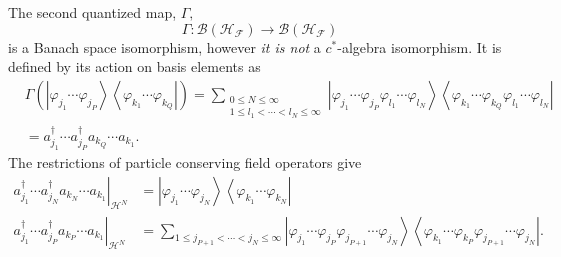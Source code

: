 \documentclass[aps,preprint]{revtex4}%
\begin{document}
The second quantized map, $\Gamma,$%
\begin{equation}
\Gamma:\mathcal{B}\left(  \mathcal{H}_{\mathcal{F}}\right)  \longrightarrow
\mathcal{B}\left(  \mathcal{H}_{\mathcal{F}}\right)
\end{equation}
is a Banach space isomorphism, however \emph{it is not} a $c^{\ast}$-algebra
isomorphism. It is defined by its action on basis elements as
\begin{align}
&  \Gamma\left(  \left\vert \varphi_{j_{1}}\cdots\varphi_{j_{P}}\right\rangle
\left\langle \varphi_{k_{1}}\cdots\varphi_{k_{Q}}\right\vert \right)
=\sum_{\substack{0\leq N\leq\infty\\1\leq l_{1}<\cdots<l_{N}\leq\infty
}}\left\vert \varphi_{j_{1}}\cdots\varphi_{j_{P}}\varphi_{l_{1}}\cdots
\varphi_{l_{N}}\right\rangle \left\langle \varphi_{k_{1}}\cdots\varphi_{k_{Q}%
}\varphi_{l_{1}}\cdots\varphi_{l_{N}}\right\vert \nonumber\\
&  =a_{j_{1}}^{\dagger}\cdots a_{j_{P}}^{\dagger}a_{k_{Q}}\cdots a_{k_{1}}.
\end{align}
The restrictions of particle conserving field operators give
\begin{align}
\left.  a_{j_{1}}^{\dagger}\cdots a_{j_{N}}^{\dagger}a_{k_{N}}\cdots a_{k_{1}%
}\right\vert _{\mathcal{H}^{N}}  &  =\left\vert \varphi_{j_{1}}\cdots
\varphi_{j_{N}}\right\rangle \left\langle \varphi_{k_{1}}\cdots\varphi_{k_{N}%
}\right\vert \nonumber\\
\left.  a_{j_{1}}^{\dagger}\cdots a_{j_{P}}^{\dagger}a_{k_{P}}\cdots a_{k_{1}%
}\right\vert _{\mathcal{H}^{N}}  &  =\sum_{1\leq j_{P+1}<\cdots<j_{N}%
\leq\infty}\left\vert \varphi_{j_{1}}\cdots\varphi_{j_{P}}\varphi_{j_{P+1}%
}\cdots\varphi_{j_{N}}\right\rangle \left\langle \varphi_{k_{1}}\cdots
\varphi_{k_{P}}\varphi_{j_{P+1}}\cdots\varphi_{j_{N}}\right\vert .
\end{align}
\end{document}
